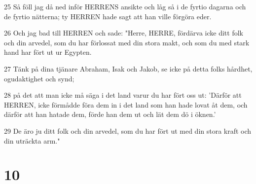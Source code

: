\par 25 Så föll jag då ned inför HERRENS ansikte och låg så i de fyrtio dagarna och de fyrtio nätterna; ty HERREN hade sagt att han ville förgöra eder.
\par 26 Och jag bad till HERREN och sade: "Herre, HERRE, fördärva icke ditt folk och din arvedel, som du har förlossat med din stora makt, och som du med stark hand har fört ut ur Egypten.
\par 27 Tänk på dina tjänare Abraham, Isak och Jakob, se icke på detta folks hårdhet, ogudaktighet och synd;
\par 28 på det att man icke må säga i det land varur du har fört oss ut: 'Därför att HERREN, icke förmådde föra dem in i det land som han hade lovat åt dem, och därför att han hatade dem, förde han dem ut och lät dem dö i öknen.'
\par 29 De äro ju ditt folk och din arvedel, som du har fört ut med din stora kraft och din uträckta arm."

\chapter{10}

